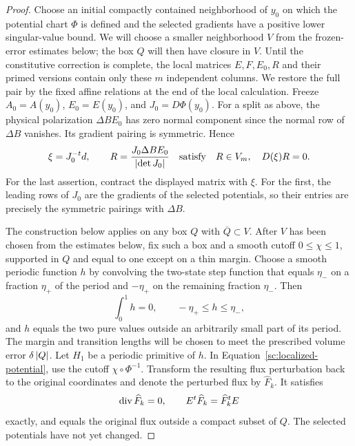 \begin{proof}
Choose an initial compactly contained neighborhood of $y_0$ on which
the potential chart $\Phi$ is defined and the selected gradients have
a positive lower singular-value bound. We will choose a smaller
neighborhood $V$ from the frozen-error estimates below; the box $Q$
will then have closure in $V$. Until the constitutive correction is
complete, the local matrices $E,F,E_0,R$ and their primed versions contain
only these $m$ independent columns. We restore the full pair by the fixed
affine relations at the end of the local calculation. Freeze
$A_0=A(y_0)$, $E_0=E(y_0)$, and $J_0=D\Phi(y_0)$.
For a split as above, the physical polarization
$\Delta B E_0$ has zero normal component since the normal row of
$\Delta B$ vanishes. Its gradient pairing is symmetric. Hence
\begin{equation}
 \label{sc:transformed-polarization}
 \xi=J_0^{-t}d,\qquad
 R=\frac{J_0\Delta B E_0}{\left\lvert \det J_0\right\rvert}
 \quad\text{satisfy}\quad R\in V_m,\quad D(\xi)R=0.
\end{equation}
For the last assertion, contract the displayed matrix with $\xi$.
For the first, the leading rows of $J_0$ are the gradients of the
selected potentials, so their entries are precisely the symmetric
pairings with $\Delta B$.

The construction below applies on any box $Q$ with
$\overline Q\subset V$. After $V$ has been chosen from the estimates
below, fix such a box and a smooth cutoff $0\leq\chi\leq1$, supported
in $Q$ and equal to one except on a thin margin. Choose a smooth
periodic function $h$ by convolving the two-state
step function that equals $\eta_-$ on a fraction $\eta_+$ of
the period and $-\eta_+$ on the remaining fraction $\eta_-$.
Then
\begin{equation}
 \label{sc:wave-properties}
 \int_0^1h=0,\qquad -\eta_+\leq h\leq\eta_-,
\end{equation}
and $h$ equals the two pure values outside an arbitrarily small
part of its period. The margin and transition lengths will be chosen
to meet the prescribed volume error $\delta\left\lvert Q\right\rvert$. Let $H_1$ be a
periodic primitive of $h$. In
Equation~\eqref{sc:localized-potential}, use the cutoff
$\chi\circ\Phi^{-1}$. Transform the resulting flux perturbation
back to the original coordinates and denote the perturbed flux by
$\widehat F_k$. It satisfies
\begin{equation}
 \label{sc:exact-preliminary-constraints}
 \operatorname{div}\widehat F_k=0,\qquad
 E^t\widehat F_k=\widehat F_k^tE
\end{equation}
exactly, and equals the original flux outside a compact subset of
$Q$. The selected potentials have not yet changed.


\end{proof}

